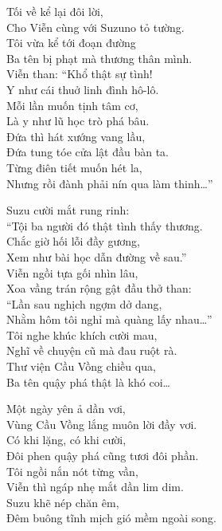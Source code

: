 \documentclass[../main.tex]{subfiles}
\begin{document}
\begin{center}
  Tối về kể lại đôi lời,\\
  Cho Viễn cùng với Suzuno tỏ tường.\\
  Tôi vừa kể tới đoạn đường\\
  Ba tên bị phạt mà thương thân mình.\\
  Viễn than: ``Khổ thật sự tình!\\
  Y như cái thuở linh đình hô-lô.\\
  Mỗi lần muốn tịnh tâm cơ,\\
  Là y như lũ học trò phá bâu.\\
  Đứa thì hát xướng vang lầu,\\
  Đứa tung tóe cửa lật đầu bàn ta.\\
  Từng điên tiết muốn hét la,\\
  Nhưng rồi đành phải nín qua làm thinh\dots''

  Suzu cười mắt rung rinh:\\
  ``Tội ba người đó thật tình thấy thương.\\
  Chắc giờ hối lỗi đầy gương,\\
  Xem như bài học dẫn đường về sau.''\\
  Viễn ngồi tựa gối nhìn lâu,\\
  Xoa vầng trán rộng gật đầu thở than:\\
  ``Lần sau nghịch ngợm dở dang,\\
  Nhằm hôm tôi nghỉ mà quàng lấy nhau\dots''\\
  Tôi nghe khúc khích cười mau,\\
  Nghĩ về chuyện cũ mà đau ruột rà.\\
  Thư viện Cầu Vồng chiều qua,\\
  Ba tên quậy phá thật là khó coi\dots

  Một ngày yên ả dần vơi,\\
  Vùng Cầu Vồng lắng muôn lời đầy vơi.\\
  Có khi lặng, có khi cười,\\
  Đôi phen quậy phá cũng tươi đôi phần.\\
  Tôi ngồi nắn nót từng vần,\\
  Viễn thì ngáp nhẹ mắt dần lim dim.\\
  Suzu khẽ nép chăn êm,\\
  Đêm buông tĩnh mịch gió mềm ngoài song.
\end{center}
\end{document}
